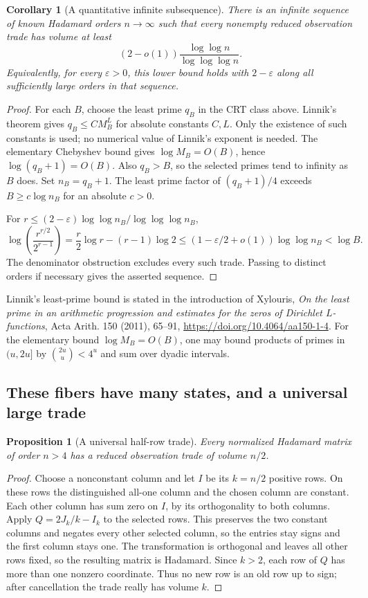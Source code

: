 \documentclass[11pt]{article}
\newtheorem{corollary}[theorem]{Corollary}
\newtheorem{proposition}[theorem]{Proposition}
\begin{document}
\begin{corollary}[A quantitative infinite subsequence]\label{trd:linnik}
There is an infinite sequence of known Hadamard orders $n\to\infty$
such that every nonempty reduced observation trade has volume at least
\[
 (2-o(1))\frac{\log\log n}{\log\log\log n}.
\]
Equivalently, for every $\varepsilon>0$, this lower bound holds with
$2-\varepsilon$ along all sufficiently large orders in that sequence.
\end{corollary}
\begin{proof}
For each $B$, choose the least prime $q_B$ in the CRT class above.
Linnik's theorem gives $q_B\le C M_B^L$ for absolute constants $C,L$.
Only the existence of such constants is used; no numerical value of
Linnik's exponent is needed. The elementary Chebyshev bound gives
$\log M_B=O(B)$, hence $\log(q_B+1)=O(B)$.
Also $q_B>B$, so the selected primes tend to infinity as $B$ does.
Set $n_B=q_B+1$. The least prime factor of $(q_B+1)/4$ exceeds
$B\ge c\log n_B$ for an absolute $c>0$.

For $r\le(2-\varepsilon)\log\log n_B/\log\log\log n_B$,
\[
 \log\!\left(\frac{r^{r/2}}{2^{r-1}}\right)
 =\frac r2\log r-(r-1)\log2
 \le(1-\varepsilon/2+o(1))\log\log n_B
 <\log B.
\]
The denominator obstruction excludes every such trade. Passing to
distinct orders if necessary gives the asserted sequence.
\end{proof}
Linnik's least-prime bound is stated in the introduction of Xylouris,
\emph{On the least prime in an arithmetic progression and estimates for
the zeros of Dirichlet $L$-functions}, Acta Arith. 150 (2011), 65--91,
\url{https://doi.org/10.4064/aa150-1-4}. For the elementary bound
$\log M_B=O(B)$, one may bound products of primes in $(u,2u]$ by
$\binom{2u}{u}<4^u$ and sum over dyadic intervals.

\subsection{These fibers have many states, and a universal large trade}
\begin{proposition}[A universal half-row trade]
Every normalized Hadamard matrix of order $n>4$ has a reduced
observation trade of volume $n/2$.
\end{proposition}
\begin{proof}
Choose a nonconstant column and let $I$ be its $k=n/2$ positive rows.
On these rows the distinguished all-one column and the chosen column
are constant. Each other column has sum zero on $I$, by its
orthogonality to both columns. Apply $Q=2J_k/k-I_k$ to the selected
rows. This preserves the two constant columns and negates every other
selected column, so the entries stay signs and the first column stays
one. The transformation is orthogonal and leaves all other rows fixed,
so the resulting matrix is Hadamard. Since $k>2$, each row of $Q$
has more than one nonzero coordinate. Thus no new row is an old row
up to sign; after cancellation the trade really has volume $k$.
\end{proof}
\end{document}
